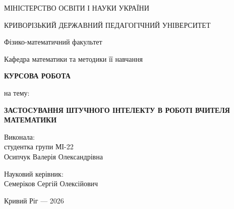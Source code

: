 \begin{titlepage}

\begin{center}

МІНІСТЕРСТВО ОСВІТИ І НАУКИ УКРАЇНИ

\vspace{1cm}

КРИВОРІЗЬКИЙ ДЕРЖАВНИЙ ПЕДАГОГІЧНИЙ УНІВЕРСИТЕТ

\vspace{0.5cm}

Фізико-математичний факультет

\vspace{0.5cm}

Кафедра математики та методики її навчання

\vspace{5cm}

{\Large\textbf{КУРСОВА РОБОТА}}

\vspace{0.5cm}

на тему:

\vspace{0.5cm}

{\Large\textbf{
ЗАСТОСУВАННЯ ШТУЧНОГО ІНТЕЛЕКТУ
В РОБОТІ ВЧИТЕЛЯ МАТЕМАТИКИ
}}

\end{center}

\vspace{3cm}

\begin{flushright}

Виконала: \\
студентка групи МІ-22 \\
Осипчук Валерія Олександрівна

\vspace{1cm}

Науковий керівник: \\
Семеріков Сергій Олексійович

\end{flushright}

\vfill

\begin{center}
Кривий Ріг — 2026
\end{center}

\end{titlepage}


\tableofcontents

